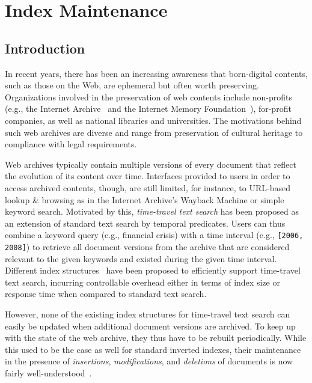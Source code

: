 \chapter{Index Maintenance}

\section{Introduction}
\label{sec:intro}


In recent years, there has been an increasing awareness that
born-digital contents, such as those on the Web, are ephemeral but
often worth preserving. Organizations involved in the preservation of
web contents include non-profits (e.g., the Internet Archive~\cite{ia}
and the Internet Memory Foundation~\cite{imf}), for-profit companies,
as well as national libraries and universities. The motivations behind
such web archives are diverse and range from preservation of cultural
heritage to compliance with legal requirements.


Web archives typically contain multiple versions of every document
that reflect the evolution of its content over time. Interfaces
provided to users in order to access archived contents, though, are
still limited, for instance, to URL-based lookup \& browsing as in the
Internet Archive's Wayback Machine or simple keyword search. Motivated
by this, \textit{time-travel text search} has been proposed as an
extension of standard text search by temporal predicates. Users can
thus combine a keyword query (e.g., \textsf{financial crisis}) with a
time interval (e.g., \texttt{\small [2006, 2008]}) to retrieve all
document versions from the archive that are considered relevant to the
given keywords and existed during the given time interval. Different
index structures~\cite{aanand:cikm2010,
  aanand:sigir2011,kberberi:sigir2007} have been proposed to
efficiently support time-travel text search, incurring controllable
overhead either in terms of index size or response time when compared
to standard text search.


However, none of the existing index structures for time-travel text
search can easily be updated when additional document versions are
archived. To keep up with the state of the web archive, they thus have
to be rebuilt periodically. While this used to be the case as well for
standard inverted indexes, their maintenance in the presence of
\textit{insertions}, \textit{modifications}, and \textit{deletions} of
documents is now fairly
well-understood~\cite{Buttcher:2008fk,Lester:2006ly,Peng:2010fk}.

